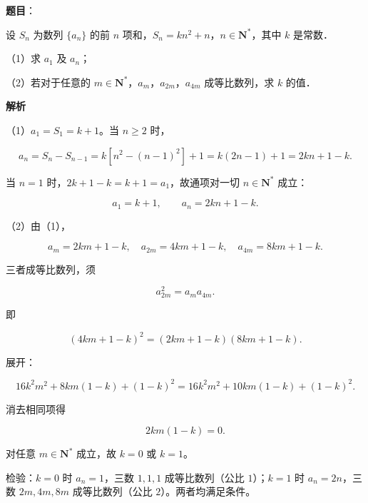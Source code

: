 \begin{answer}

\textbf{题目}：

设 $S_n$ 为数列 $\{a_n\}$ 的前 $n$ 项和，$S_n=kn^2+n$，$n\in\mathbf N^*$，其中 $k$ 是常数．

（1）求 $a_1$ 及 $a_n$；

（2）若对于任意的 $m\in\mathbf N^*$，$a_m$，$a_{2m}$，$a_{4m}$ 成等比数列，求 $k$ 的值．

\textbf{解析}

（1）$a_1=S_1=k+1$。当 $n\geqslant2$ 时，

\nopagebreak[4]
\[a_n=S_n-S_{n-1}
=k[n^2-(n-1)^2]+1
=k(2n-1)+1
=2kn+1-k.\]

当 $n=1$ 时，$2k+1-k=k+1=a_1$，故通项对一切 $n\in\mathbf N^*$ 成立：

\nopagebreak[4]
\[a_1=k+1,\qquad a_n=2kn+1-k.\]

（2）由（1），

\nopagebreak[4]
\[a_m=2km+1-k,\quad
a_{2m}=4km+1-k,\quad
a_{4m}=8km+1-k.\]

三者成等比数列，须

\nopagebreak[4]
\[a_{2m}^2=a_ma_{4m}.\]

即

\nopagebreak[4]
\[(4km+1-k)^2=(2km+1-k)(8km+1-k).\]

展开：

\nopagebreak[4]
\[16k^2m^2+8km(1-k)+(1-k)^2
=16k^2m^2+10km(1-k)+(1-k)^2.\]

消去相同项得

\nopagebreak[4]
\[2km(1-k)=0.\]

对任意 $m\in\mathbf N^*$ 成立，故 $k=0$ 或 $k=1$。

检验：$k=0$ 时 $a_n=1$，三数 $1,1,1$ 成等比数列（公比 $1$）；$k=1$ 时 $a_n=2n$，三数 $2m,4m,8m$ 成等比数列（公比 $2$）。两者均满足条件。


\end{answer}
